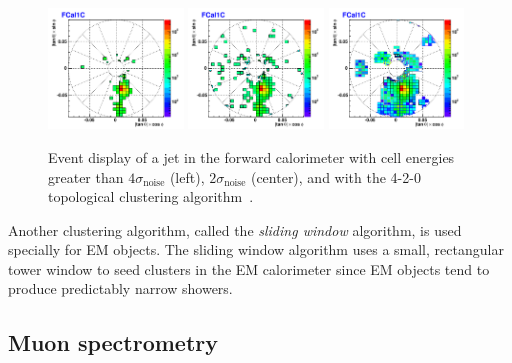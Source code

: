 \begin{figure}[tp]
  \centering
  \includegraphics[width=0.32\textwidth]{figures/lhc-atlas/FCal1C_JF50_28_4sigma}
  \includegraphics[width=0.32\textwidth]{figures/lhc-atlas/FCal1C_JF50_28_2sigma}
  \includegraphics[width=0.32\textwidth]{figures/lhc-atlas/FCal1C_JF50_28}
  \caption{Event display of a jet in the forward calorimeter with cell energies greater than $4\sigma_\text{noise}$ (left), $2\sigma_\text{noise}$ (center), and with the \textsc{4-2-0} topological clustering algorithm~\cite{ATL-SLIDE-2007-027}.}
  \label{fig:atlas-detector-clustering}
\end{figure}

Another clustering algorithm, called the \textit{sliding window} algorithm, is used specially for EM objects. The sliding window algorithm uses a small, rectangular tower window to seed clusters in the EM calorimeter since EM objects tend to produce predictably narrow showers. %

\subsection{Muon spectrometry}

